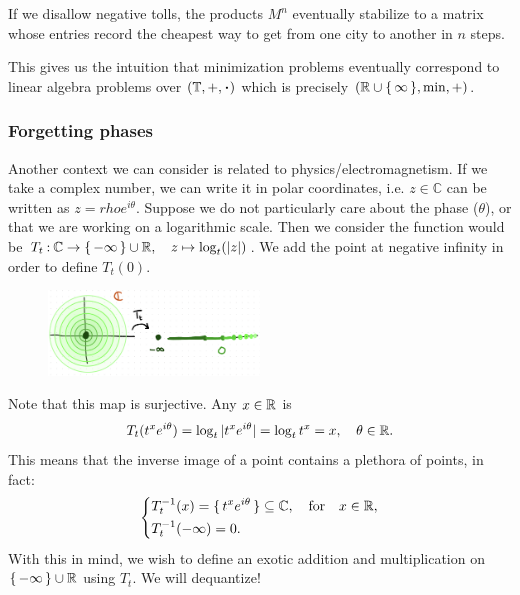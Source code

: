 \documentclass[12pt]{memoir}
\theoremstyle{definition}
\def\CC{{\mathbb C}}
\begin{document}
\begin{Rmk}
If we disallow negative tolls, the products $M^n$ eventually stabilize to a matrix whose entries record the cheapest way to get from one city to another in $n$ steps.
\end{Rmk}
This gives us the intuition that minimization problems eventually correspond to linear algebra problems over $(\bT,+,\.)$ which is precisely $(\mathbb{R}\cup\{\,\infty\,\},\min,+)$.

\subsubsection{Forgetting phases}



Another context we can consider is related to physics/electromagnetism. If we take a complex number, we can write it in polar coordinates, i.e. $z \in \CC$ can be written as $z = rho e^{i \theta}$. Suppose we do not particularly care about the phase ($\theta$), or that we are working on a logarithmic scale. Then we consider the function would be $T_t\mathbin{:}\mathbb{C}\to\{\,-\infty\,\}\cup\mathbb{R},\quad z\mapsto\log_t(|z|)$. We add the point at negative infinity in order to define $T_t(0)$.

\begin{figure}[h!]
    \centering
    \includegraphics[width=0.5\textwidth]{figs/fig1-3.png}
\end{figure}


Note that this map is surjective. Any $x\in\mathbb{R}$ is 
$$T_t(t^xe^{i\theta})=\log_t|t^xe^{i\theta}|=\log_tt^x=x,\quad\theta\in\mathbb{R}.$$
This means that the inverse image of a point contains a plethora of points, in fact:
$$
\left\lbrace
\begin{aligned}
    &T_t^{-1}(x)=\{\,t^xe^{i\theta}\,\}\subseteq\mathbb{C},\quad\text{for}\quad x\in\mathbb{R},\\
    &T_t^{-1}(-\infty)=0.
\end{aligned}
\right.
$$
With this in mind, we wish to define an exotic addition and multiplication on $\{\,-\infty\,\}\cup\mathbb{R}$ using $T_t$. We will dequantize!\par 
\end{document}
